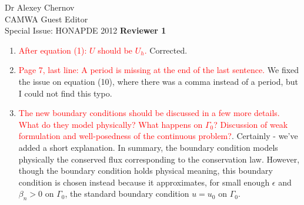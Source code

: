 \documentclass{letter}
\begin{document}
\begin{letter}{Dr Alexey Chernov\\CAMWA Guest Editor\\Special Issue: HONAPDE 2012}
\textbf{Reviewer 1}

%


\begin{enumerate}
\item \textcolor{red}{After equation (1): $U$ should be $U_h$.}  Corrected.

\item \textcolor{red}{Page 7, last line: A period is missing at the end of the last sentence.}   We fixed the issue on equation (10), where there was a comma instead of a period, but I could not find this typo.  

\item \textcolor{red}{The new boundary conditions should be discussed in a few more details. What do they model physically? What happens on $\Gamma_0$? Discussion of weak formulation and well-posedness of the continuous problem?}.  Certainly - we've added a short explanation.  In summary, the boundary condition models physically the conserved flux corresponding to the conservation law.  However, though the boundary condition holds physical meaning, this boundary condition is chosen instead because it approximates, for small enough $\epsilon$ and $\beta_n > 0$ on $\Gamma_0$, the standard boundary condition $u = u_0$ on $\Gamma_0$.  


\end{enumerate}
\end{letter}
\end{document}

